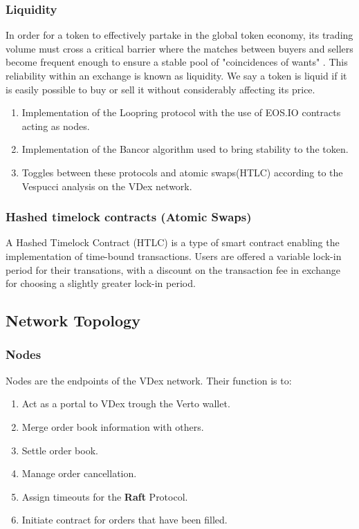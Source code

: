 \documentclass[]{article}
\begin{document}
{	
	\subsubsection{Liquidity}
	In order for a token to effectively partake in the global token
	economy, its trading volume must cross a critical barrier where
	the matches between buyers and sellers become frequent enough to ensure a stable pool of "coincidences of wants" \cite{10}. 
	This reliability within an exchange is known as liquidity. We say a token is liquid if it is easily possible to buy or sell it without considerably affecting its price.

	
	\begin{enumerate} 
		\item Implementation of the Loopring protocol with the use of EOS.IO contracts acting as nodes.\cite{7}
		\item Implementation of the Bancor algorithm used to bring stability to the token.\cite{10}
		\item Toggles between these protocols and atomic swaps(HTLC) according to the Vespucci analysis on the VDex network.
		\end{enumerate}
	
	\subsubsection{Hashed timelock contracts (Atomic Swaps)}
	A Hashed Timelock Contract (HTLC)\cite{22} is a type of smart contract enabling the implementation of time-bound transactions.
	Users are offered a variable lock-in period for their transations, 
	with a discount on the transaction fee in exchange for choosing a slightly greater lock-in period.
	
	\subsection{Network Topology}
	\subsubsection{Nodes}
	Nodes are the endpoints of the VDex network.
	Their function is to:\
	\begin{enumerate}
		\item Act as a portal to VDex trough the Verto wallet.
		\item Merge order book information with others.
		\item Settle order book.\
		\item Manage order cancellation.\
		\item Assign timeouts for the \textbf{Raft} Protocol.\
		\item Initiate contract for orders that have been filled.
	\end{enumerate}

}
\end{document}

